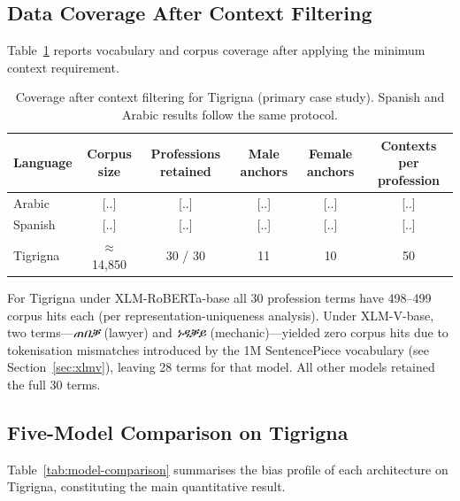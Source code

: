 \documentclass[10pt]{article}
\begin{document}
\subsection{Data Coverage After Context Filtering}
\label{sec:coverage}

Table~\ref{tab:coverage} reports vocabulary and corpus coverage after
applying the minimum context requirement.

\begin{table}[H]
\centering
\caption{Coverage after context filtering for Tigrigna (primary case study).
         Spanish and Arabic results follow the same protocol.}
\label{tab:coverage}
\small
\begin{tabular}{lccccc}
\toprule
Language & Corpus size & Professions retained & Male anchors & Female anchors & Contexts per profession \\
\midrule
Arabic   & {[..]}   & {[..]}  & {[..]} & {[..]}  & {[..]}  \\
Spanish  & {[..]}   & {[..]}  & {[..]} & {[..]}  & {[..]}  \\
Tigrigna & $\approx$14{,}850 & 30 / 30 & 11 & 10 & 50 \\
\bottomrule
\end{tabular}
\end{table}

For Tigrigna under XLM-RoBERTa-base all 30 profession terms have 498--499
corpus hits each (per representation-uniqueness analysis). Under XLM-V-base,
two terms---\textit{ጠበቓ} (lawyer) and \textit{ነዳቓይ} (mechanic)---yielded
zero corpus hits due to tokenisation mismatches introduced by the 1M
SentencePiece vocabulary (see Section~\ref{sec:xlmv}), leaving 28 terms
for that model. All other models retained the full 30 terms.

\subsection{Five-Model Comparison on Tigrigna}
\label{sec:fivemodel}

Table~\ref{tab:model-comparison} summarises the bias profile of each
architecture on Tigrigna, constituting the main quantitative result.
\end{document}
